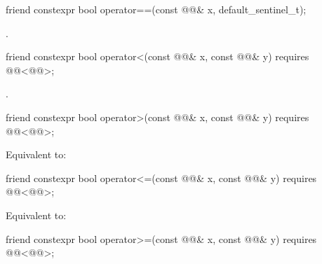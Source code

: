 %
\begin{itemdecl}
friend constexpr bool operator==(const @@& x, default_sentinel_t);
\end{itemdecl}

\begin{itemdescr}
\pnum
\returns
{}.
\end{itemdescr}

%
\begin{itemdecl}
friend constexpr bool operator<(const @@& x, const @@& y)
  requires @@<@@>;
\end{itemdecl}

\begin{itemdescr}
\pnum
\returns
{}.
\end{itemdescr}

%
\begin{itemdecl}
friend constexpr bool operator>(const @@& x, const @@& y)
  requires @@<@@>;
\end{itemdecl}

\begin{itemdescr}
\pnum
\effects
Equivalent to: 
\end{itemdescr}

%
\begin{itemdecl}
friend constexpr bool operator<=(const @@& x, const @@& y)
  requires @@<@@>;
\end{itemdecl}

\begin{itemdescr}
\pnum
\effects
Equivalent to: 
\end{itemdescr}

%
\begin{itemdecl}
friend constexpr bool operator>=(const @@& x, const @@& y)
  requires @@<@@>;
\end{itemdecl}

